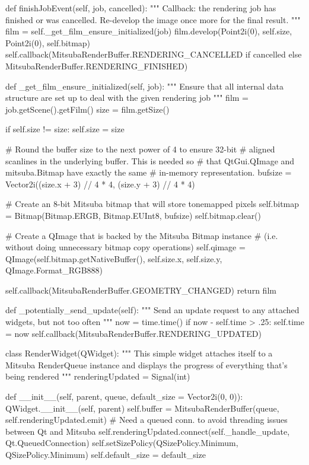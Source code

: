 \begin{python}
    def finishJobEvent(self, job, cancelled):
        """ Callback: the rendering job has finished or was cancelled.
            Re-develop the image once more for the final result. """
        film = self._get_film_ensure_initialized(job)
        film.develop(Point2i(0), self.size, Point2i(0), self.bitmap)
        self.callback(MitsubaRenderBuffer.RENDERING_CANCELLED if cancelled
                      else MitsubaRenderBuffer.RENDERING_FINISHED)

    def _get_film_ensure_initialized(self, job):
        """ Ensure that all internal data structure are set up to deal
            with the given rendering job """
        film = job.getScene().getFilm()
        size = film.getSize()

        if self.size != size:
            self.size = size

            # Round the buffer size to the next power of 4 to ensure 32-bit
            # aligned scanlines in the underlying buffer. This is needed so
            # that QtGui.QImage and mitsuba.Bitmap have exactly the same
            # in-memory representation.
            bufsize = Vector2i((size.x + 3) // 4 * 4, (size.y + 3) // 4 * 4)

            # Create an 8-bit Mitsuba bitmap that will store tonemapped pixels
            self.bitmap = Bitmap(Bitmap.ERGB, Bitmap.EUInt8, bufsize)
            self.bitmap.clear()

            # Create a QImage that is backed by the Mitsuba Bitmap instance
            # (i.e. without doing unnecessary bitmap copy operations)
            self.qimage = QImage(self.bitmap.getNativeBuffer(), self.size.x,
                                 self.size.y, QImage.Format_RGB888)

            self.callback(MitsubaRenderBuffer.GEOMETRY_CHANGED)
        return film

    def _potentially_send_update(self):
        """ Send an update request to any attached widgets, but not too often """
        now = time.time()
        if now - self.time > .25:
            self.time = now
            self.callback(MitsubaRenderBuffer.RENDERING_UPDATED)

class RenderWidget(QWidget):
    """ This simple widget attaches itself to a Mitsuba RenderQueue instance
        and displays the progress of everything that's being rendered """
    renderingUpdated = Signal(int)

    def __init__(self, parent, queue, default_size = Vector2i(0, 0)):
        QWidget.__init__(self, parent)
        self.buffer = MitsubaRenderBuffer(queue, self.renderingUpdated.emit)
        # Need a queued conn. to avoid threading issues between Qt and Mitsuba
        self.renderingUpdated.connect(self._handle_update, Qt.QueuedConnection)
        self.setSizePolicy(QSizePolicy.Minimum, QSizePolicy.Minimum)
        self.default_size = default_size


\end{python}
